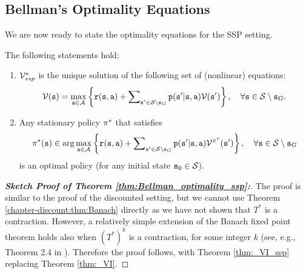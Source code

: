 \subsection{Bellman's Optimality Equations}
We are now ready to state the optimality equations for the SSP setting.

\begin{theorem}
\label{thm:Bellman_optimality_ssp}
The following statements hold:
\begin{enumerate}
  \item $\mathcal{V}_{ssp}^*$ is the unique solution of the following set of (nonlinear) equations:
\begin{equation}\label{eq:Bellman2}
\mathcal{V}({\tt s}) = \mathop {\max }\limits_{{\tt a} \in \mathcal{A}}
\left\{ {{\tt r}({\tt s},{\tt a}) + \sum\nolimits_{{\tt s}'
\in \mathcal{S} \setminus {\tt s}_G} {{\tt p}({\tt s}'|{\tt s},{\tt a})\mathcal{V}({\tt s}')} } \right\},
\quad \forall {\tt s} \in \mathcal{S} \setminus {\tt s}_G.
\end{equation}
  \item Any stationary policy ${\pi ^*}$ that satisfies
\[{\pi ^*}({\tt s}) \in \arg {\max _{{\tt a}\in \mathcal{A}}}\left\{ {{\tt r}({\tt s},{\tt a}) +  \sum\nolimits_{{\tt s}' \in \mathcal{S} \setminus {\tt s}_G} {{\tt p}({\tt s}'|{\tt s},{\tt a})\mathcal{V}^{\pi^*}({\tt s}')} } \right\},
\quad \forall {\tt s} \in \mathcal{S} \setminus {\tt s}_G\]
     is an optimal policy (for any initial state ${{\tt s}_0} \in \mathcal{S}$).
\end{enumerate}
\end{theorem}

\begin{proof}[\textbf{Sketch Proof of Theorem \ref{thm:Bellman_optimality_ssp}:}]
The proof is similar to the proof of the discounted setting, but we cannot use Theorem \ref{chapter-discount:thm:Banach} directly as we have not shown that $T^*$ is a contraction. However, a relatively simple extension of the Banach fixed point theorem holds also when $(T^*)^{k}$ is a contraction, for some integer $k$ (see, e.g., Theorem 2.4 in \cite{latif2014banach}). Therefore the proof follows, with Theorem \ref{thm:_VI_ssp} replacing Theorem \ref{thm:_VI}.
\end{proof}




